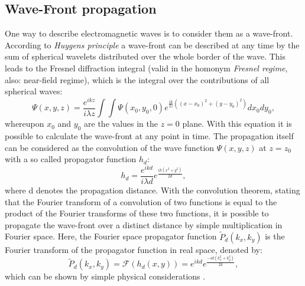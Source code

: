 \subsection{Wave-Front propagation}\label{subsec:wp}
One way to describe electromagnetic waves is to consider them as a wave-front.
According to \textit{Huygens principle} a wave-front can be described at any time by the sum of spherical wavelets distributed over the whole border of the wave. This leads to the Fresnel diffraction integral (valid in the homonym \textit{Fresnel regime}, also: near-field regime), which is the integral over the contributions of all spherical waves:
\begin{equation}
\Psi (x,y,z) = \frac{e^{ikz}}{i\lambda z} \int\int \Psi(x_{0},y_{0},0)e^{\frac{ik}{2z}((x-x_{0})^{2}+(y-y_{0})^{2})} dx_{0}dy_{0} ,
\end{equation}
whereupon $x_{0}$ and $y_{0}$ are the values in the $z = 0$ plane. With this equation it is possible to calculate the wave-front at any point in time.
\clearpage 
The propagation itself can be considered as the convolution of the wave function $\Psi(x,y,z)$ at $z = z_{0}$ with a so called propagator function $h_{d}$:
\begin{equation}
h_{d} = \frac{e^{ikd}}{i\lambda d} e^{\frac{ik(x^{2}+y^{2})}{2d}} , 
\end{equation}
where d denotes the propagation distance. With the convolution theorem, stating that the Fourier transform of a convolution of two functions is equal to the product of the Fourier transforms of these two functions, it is possible to propagate the wave-front over a distinct distance by simple multiplication in Fourier space. Here, the Fourier space propagator function $\tilde{P}_{d}(k_{x},k_{y})$ is the Fourier transform  of the propagator function in real space, denoted by:
\begin{equation}
\tilde{P}_{d}(k_{x},k_{y}) = \mathcal{F}(h_{d}(x,y)) = e^{ikd}e^{\frac{-id(k_{x}^{2}+k_{y}^{2})}{2k}} ,
\end{equation}\label{propfunc}
which can be shown by simple physical considerations \citep{Bech2009}.  
